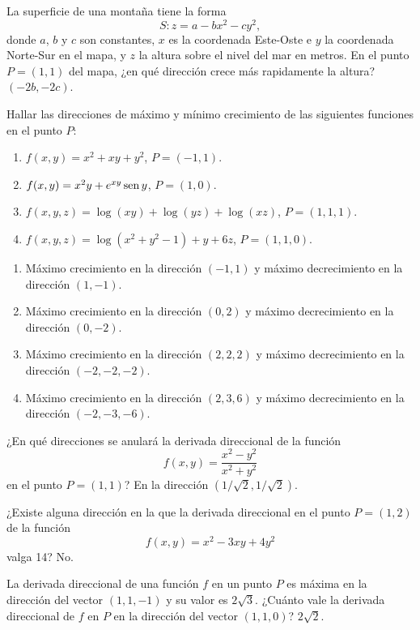 {La superficie de una montaña tiene la forma
\[
S:z=a-bx^2-cy^2,
\]
donde $a$, $b$ y $c$ son constantes, $x$ es la coordenada Este-Oste e $y$ la coordenada Norte-Sur en el mapa, y $z$ la altura sobre el nivel del mar en metros. 
En el punto $P=(1,1)$ del mapa, ¿en qué dirección crece más rapidamente la altura?
}
{$(-2b,-2c)$.
}
{
}


{Hallar las direcciones de máximo y mínimo crecimiento de las siguientes funciones en el punto $P$:
\begin{enumerate}
\item $f(x,y)=x^2+xy+y^2$, $P=(-1,1)$.
\item $f(x,y)=x^2y+e^{xy}\operatorname{sen} y$, $P=(1,0)$.
\item $f(x,y,z)=\log(xy)+\log(yz)+\log(xz)$, $P=(1,1,1)$.
\item $f(x,y,z)=\log(x^2+y^2-1)+y+6z$, $P=(1,1,0)$.
\end{enumerate}
}
{\begin{enumerate}
\item Máximo crecimiento en la dirección $(-1,1)$ y máximo decrecimiento en la dirección $(1,-1)$.
\item Máximo crecimiento en la dirección $(0,2)$ y máximo decrecimiento en la dirección $(0,-2)$.
\item Máximo crecimiento en la dirección $(2,2,2)$ y máximo decrecimiento en la dirección $(-2,-2,-2)$.
\item Máximo crecimiento en la dirección $(2,3,6)$ y máximo decrecimiento en la dirección $(-2,-3,-6)$.
\end{enumerate}
}
{
}


{¿En qué direcciones se anulará la derivada direccional de la función
\[
f(x,y)=\frac{x^2-y^2}{x^2+y^2}
\]
en el punto $P=(1,1)$?
}
{En la dirección $(1/\sqrt{2},1/\sqrt{2})$.
}
{
}


{¿Existe alguna dirección en la que la derivada direccional en el punto $P=(1,2)$ de la función 
\[
f(x,y) = x^2-3xy+4y^2
\]
valga 14?
}
{No.
}
{
}


{La derivada direccional de una función $f$ en un punto $P$ es máxima en la dirección del vector $(1,1,-1)$ y su valor es $2\sqrt{3}$.
¿Cuánto vale la derivada direccional de $f$ en $P$ en la dirección del vector $(1,1,0)$?
}
{$2\sqrt{2}$.
}
{
}


